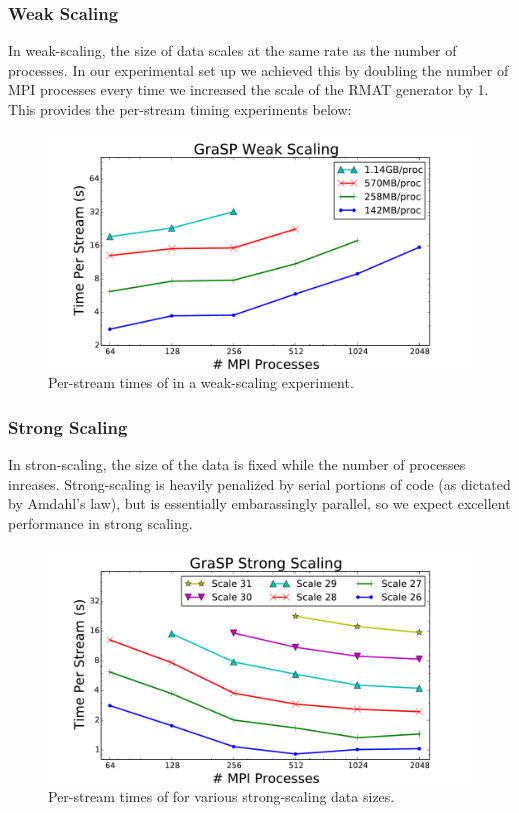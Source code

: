 \subsubsection{Weak Scaling}
In weak-scaling, the size of data scales at the same rate as the number of processes. In our experimental set up we achieved this by doubling the number of MPI processes every time we increased the scale of the RMAT generator by 1. This provides the per-stream timing experiments below:
\begin{figure}[t!]
\centering
  \includegraphics[width=0.9\columnwidth]{figures/weak_scaling.pdf}
  \caption{Per-stream times of \ourmethod in a weak-scaling experiment.}
  \label{fig:kronspeed}
\end{figure}

\subsubsection{Strong Scaling}
In stron-scaling, the size of the data is fixed while the number of processes inreases. Strong-scaling is heavily penalized by serial portions of code (as dictated by Amdahl's law), but \ourmethod is essentially embarassingly parallel, so we expect excellent performance in strong scaling. 

\begin{figure}[b!]
\centering
  \includegraphics[width=0.9\columnwidth]{figures/strong_scaling.pdf}
  \caption{Per-stream times of \ourmethod for various strong-scaling data sizes.}
  \label{fig:kronspeed}
\end{figure}


